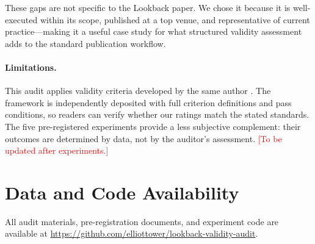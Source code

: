 \documentclass[11pt]{article}
\begin{document}
These gaps are not specific to the Lookback paper. We chose it because it is well-executed within its scope, published at a top venue, and representative of current practice---making it a useful case study for what structured validity assessment adds to the standard publication workflow.

\paragraph{Limitations.}
This audit applies validity criteria developed by the same author \citep{tower2026mechval}. The framework is independently deposited with full criterion definitions and pass conditions, so readers can verify whether our ratings match the stated standards. The five pre-registered experiments provide a less subjective complement: their outcomes are determined by data, not by the auditor's assessment. \textcolor{red}{[To be updated after experiments.]}


\section*{Data and Code Availability}

All audit materials, pre-registration documents, and experiment code are available at \url{https://github.com/elliottower/lookback-validity-audit}.




\end{document}
